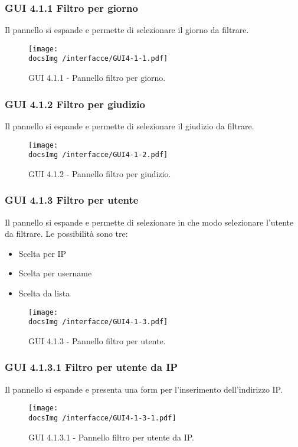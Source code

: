 \subsubsection{GUI 4.1.1 Filtro per giorno}
Il pannello si espande e permette di selezionare il giorno da filtrare.
\begin{figure}[htbp]
\centering
\texttt{[image: \\docsImg /interfacce/GUI4-1-1.pdf]}
\caption{GUI 4.1.1 - Pannello filtro per giorno.}
\end{figure}

\subsubsection{GUI 4.1.2 Filtro per giudizio}
Il pannello si espande e permette di selezionare il giudizio da filtrare. 
\begin{figure}[htbp]
\centering
\texttt{[image: \\docsImg /interfacce/GUI4-1-2.pdf]}
\caption{GUI 4.1.2 - Pannello filtro per giudizio.}
\end{figure}

\subsubsection{GUI 4.1.3 Filtro per utente}
Il pannello si espande e permette di selezionare in che modo selezionare l’utente da filtrare. Le possibilità sono tre: 
\begin{itemize}
\item Scelta per IP\g
\item Scelta per username
\item Scelta da lista
\end{itemize}
\begin{figure}[htbp]
\centering
\texttt{[image: \\docsImg /interfacce/GUI4-1-3.pdf]}
\caption{GUI 4.1.3 - Pannello filtro per utente.}
\end{figure}

\subsubsection{GUI 4.1.3.1 Filtro per utente da IP}
Il pannello si espande e presenta una form per l’inserimento dell’indirizzo IP\g.
\begin{figure}[htbp]
\centering
\texttt{[image: \\docsImg /interfacce/GUI4-1-3-1.pdf]}
\caption{GUI 4.1.3.1 - Pannello filtro per utente da IP.}
\end{figure}

